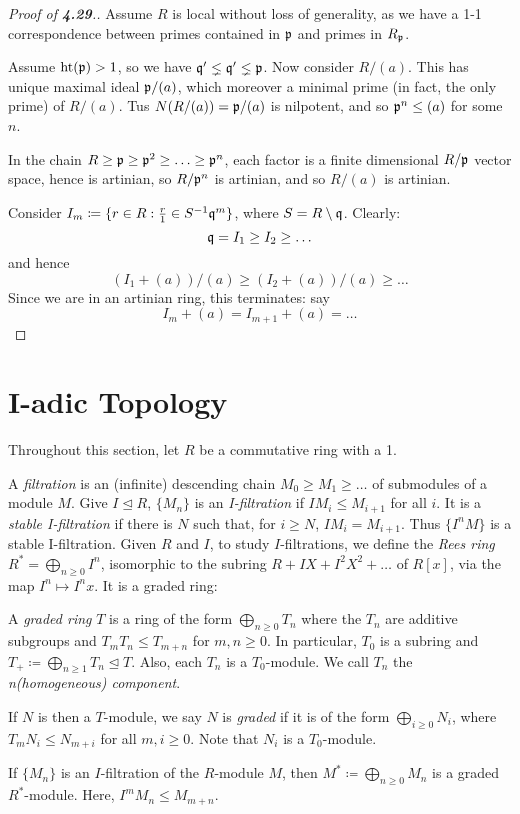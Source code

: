 \documentclass[10pt,a4paper]{article}
\begin{document}
\begin{proof}[Proof of \textbf{4.29}.]
  Assume $R$ is local without loss of generality, as we have a 1-1 correspondence between primes contained in $\mathfrak{p}$ and primes in $R_{\mathfrak{p}}$.

  Assume $\operatorname{ht}(\mathfrak{p}) > 1$, so we have $\mathfrak{q}'\lneq \mathfrak{q}' \lneq \mathfrak{p}$. Now consider $R/(a)$. This has unique maximal ideal $\mathfrak{p}/(a)$, which moreover a minimal prime (in fact, the only prime) of $R/(a)$. Tus $N(R/(a)) = \mathfrak{p}/(a)$ is nilpotent, and so $\mathfrak{p}^n\leq (a)$ for some $n$.

  In the chain $R \geq \mathfrak{p} \geq \mathfrak{p}^2 \geq \ldots \geq \mathfrak{p}^n$, each factor is a finite dimensional $R/\mathfrak{p}$ vector space, hence is artinian, so $R/\mathfrak{p}^n$ is artinian, and so $R/(a)$ is artinian.

  Consider $I_m \coloneqq \{r \in R : \frac{r}{1} \in S^{-1}\mathfrak{q}^m\}$, where $S = R \setminus \mathfrak{q}$. Clearly:
  \[\mathfrak{q} = I_1 \geq I_2 \geq \ldots \]
  and hence
  \[(I_1 + (a))/(a) \geq (I_2+(a))/(a) \geq \ldots\]
  Since we are in an artinian ring, this terminates: say
  \[I_m+(a) = I_{m+1} + (a) = \ldots\]
\end{proof}
\section{I-adic Topology}
Throughout this section, let $R$ be a commutative ring with a 1.
\begin{definition}
  A \emph{filtration} is an (infinite) descending chain $M_0 \geq M_1 \geq \ldots$ of submodules of a module $M$. Give $I \trianglelefteq R$, $\{M_n\}$ is an \emph{I-filtration} if $IM_i \leq M_{i+1}$ for all $i$. It is a \emph{stable I-filtration} if there is $N$ such that, for $i \geq N$, $IM_i = M_{i+1}$. Thus $\{I^n M\}$ is a stable I-filtration. Given $R$ and $I$, to study $I$-filtrations, we define the \emph{Rees ring} $R^\ast = \bigoplus_{n\geq 0} I^n$, isomorphic to the subring $R + IX + I^2X^2 + \ldots$ of $R[x]$, via the map $I^n \mapsto I^nx$. It is a graded ring:
\end{definition}
\begin{definition}
  A \emph{graded ring} $T$ is a ring of the form $\bigoplus_{n\geq 0} T_n$ where the $T_n$ are additive subgroups and $T_m T_n \leq T_{m+n}$ for $m, n \geq 0$. In particular, $T_0$ is a subring and $T_+ \coloneqq \bigoplus_{n \geq 1}T_n \trianglelefteq T$. Also, each $T_n$ is a $T_0$-module. We call $T_n$ the \emph{n\th (homogeneous) component}.

  If $N$ is then a $T$-module, we say $N$ is \emph{graded} if it is of the form $\bigoplus_{i\geq 0} N_i$, where $T_m N_i \leq N_{m + i}$ for all $m, i \geq 0$. Note that $N_i$ is a $T_0$-module.
\end{definition}
If $\{M_n\}$ is an $I$-filtration of the $R$-module $M$, then $M^\ast \coloneqq \bigoplus_{n\geq 0}M_n$ is a graded $R^\ast$-module. Here, $I^m M_n \leq M_{m+n}$.
\end{document}
